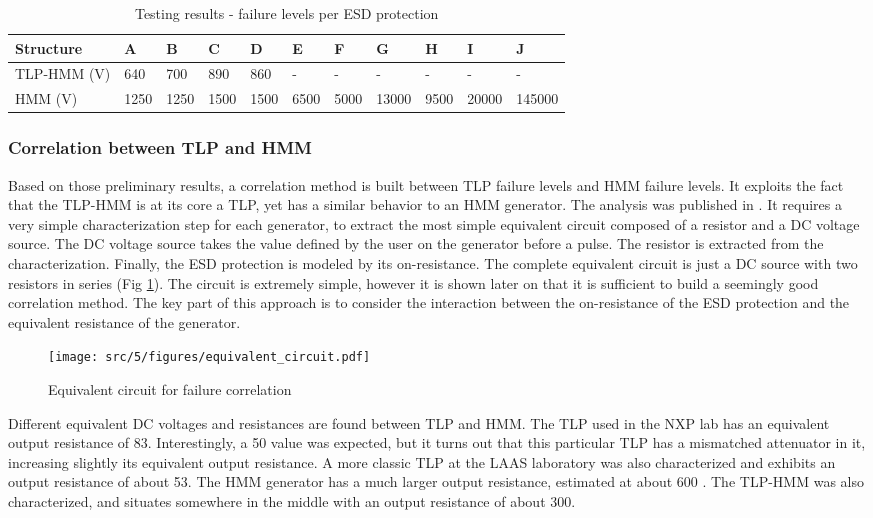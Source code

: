 \begin{table}[!h]
\centering
\begin{tabular}{@{}lllllllllll@{}}
\toprule
Structure   & A     & B     & C      & D    & E    & F    & G     & H    & I     & J      \\ \midrule
TLP-HMM (V) & 640   & 700   & 890    & 860  & -    & -    & -     & -    & -     & -      \\
HMM     (V) & 1250  & 1250  & 1500   & 1500 & 6500 & 5000 & 13000 & 9500 & 20000 & 145000 \\
\end{tabular}
\caption{Testing results - failure levels per ESD protection}
\label{tab:esd-protections}
\end{table}

\subsubsection{Correlation between TLP and HMM}

Based on those preliminary results, a correlation method is built between TLP failure levels and HMM failure levels.
It exploits the fact that the TLP-HMM is at its core a TLP, yet has a similar behavior to an HMM generator.
The analysis was published in \cite{my-publi-tlp-hmm}.
It requires a very simple characterization step for each generator, to extract the most simple equivalent circuit composed of a resistor and a DC voltage source.
The DC voltage source takes the value defined by the user on the generator before a pulse.
The resistor is extracted from the characterization.
Finally, the ESD protection is modeled by its on-resistance.
The complete equivalent circuit is just a DC source with two resistors in series (Fig \ref{fig:simple_equivalent_circuit}).
The circuit is extremely simple, however it is shown later on that it is sufficient to build a seemingly good correlation method.
The key part of this approach is to consider the interaction between the on-resistance of the ESD protection and the equivalent resistance of the generator.

\begin{figure}[!h]
  \centering
  \texttt{[image: src/5/figures/equivalent\_circuit.pdf]}
  \caption{Equivalent circuit for failure correlation}
  \label{fig:simple_equivalent_circuit}
\end{figure}

Different equivalent DC voltages and resistances are found between TLP and HMM.
The TLP used in the NXP lab has an equivalent output resistance of 83\textOmega{}.
Interestingly, a 50\textOmega{} value was expected, but it turns out that this particular TLP has a mismatched attenuator in it, increasing slightly its equivalent output resistance.
A more classic TLP at the LAAS laboratory was also characterized and exhibits an output resistance of about 53\textOmega{}.
The HMM generator has a much larger output resistance, estimated at about 600 \textOmega{}.
The TLP-HMM was also characterized, and situates somewhere in the middle with an output resistance of about 300\textOmega{}.

